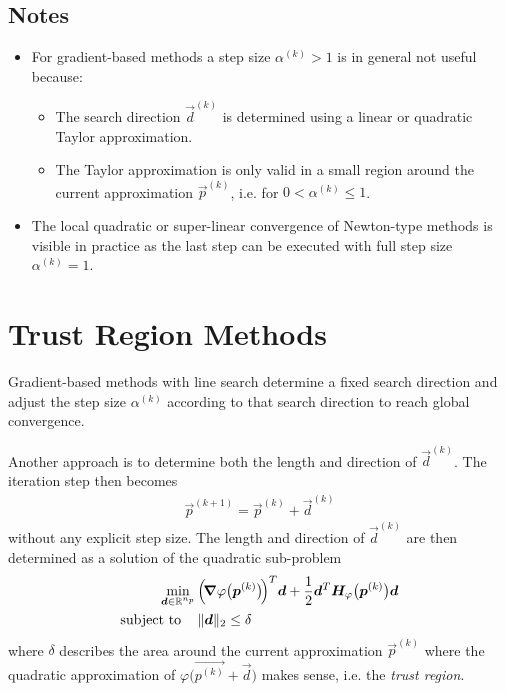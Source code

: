 		\subsection{Notes}
			\begin{itemize}
				\item For gradient-based methods a step size \( \alpha^{(k)} > 1 \) is in general not useful because:
					\begin{itemize}
						\item The search direction \( \vec{d}^{(k)} \) is determined using a linear or quadratic Taylor approximation.
						\item The Taylor approximation is only valid in a small region around the current approximation \( \vec{p}^{(k)} \), i.e. for \( 0 < \alpha^{(k)} \leq 1 \).
					\end{itemize}
				\item The local quadratic or super-linear convergence of Newton-type methods is visible in practice as the last step can be executed with full step size \( \alpha^{(k)} = 1 \).
			\end{itemize}

	\section{Trust Region Methods}
		Gradient-based methods with line search determine a fixed search direction and adjust the step size \( \alpha^{(k)} \) according to that search direction to reach global convergence.

		Another approach is to determine both the length and direction of \( \vec{d}^{(k)} \). The iteration step then becomes
		\begin{align*}
			\vec{p}^{(k + 1)} = \vec{p}^{(k)} + \vec{d}^{(k)}
		\end{align*}
		without any explicit step size. The length and direction of \( \vec{d}^{(k)} \) are then determined as a solution of the quadratic sub-problem
		\begin{align*}
			\min_{\bm{d} \in \mathbb{R}^{n_p}} & \, \Big(\! \grad{\varphi}\big(\bm{p}^{(k)}\big) \!\Big)^T \bm{d} + \frac{1}{2} \bm{d}^T \bm{H}_\varphi\big(\bm{p}^{(k)}\big) \bm{d} \\
			\mathrm{subject~to}\quad    & \,
			\begin{alignedat}[t]{2}
				\lVert \bm{d} \rVert_2 & \leq \delta
			\end{alignedat}
		\end{align*}
		where \(\delta\) describes the area around the current approximation \( \vec{p}^{(k)} \) where the quadratic approximation of \( \varphi\big(\vec{p^{(k)}} + \vec{d}\big) \) makes sense, i.e. the \emph{trust region}.

